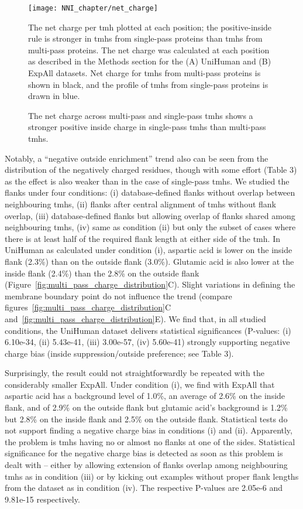 \begin{figure}[!ht]
\centering
\texttt{[image: NNI\_chapter/net\_charge]}
\caption{The net charge across multi-pass and single-pass \gls{tmh}s shows a stronger positive inside charge in single-pass \gls{tmh}s than multi-pass \gls{tmh}s.}
\medskip
\small
\justify
The net charge per \gls{tmh} plotted at each position; the positive-inside rule is stronger in \gls{tmh}s from single-pass proteins than \gls{tmh}s from multi-pass proteins. The net charge was calculated at each position as described in the Methods section for the (A) UniHuman and (B) ExpAll datasets. Net charge for \gls{tmh}s from multi-pass proteins is shown in black, and the profile of \gls{tmh}s from single-pass proteins is drawn in blue.
\label{fig:net_charge}
\end{figure}

Notably, a ``negative outside enrichment'' trend also can be seen from the distribution of the negatively charged residues, though with some effort (Table 3) as the effect is also weaker than in the case of single-pass \gls{tmh}s. We studied the flanks under four conditions: (i) database-defined flanks without overlap between neighbouring \gls{tmh}s, (ii) flanks after central alignment of \gls{tmh}s without flank overlap, (iii) database-defined flanks but allowing overlap of flanks shared among neighbouring \gls{tmh}s, (iv) same as condition (ii) but only the subset of cases where there is at least half of the required flank length at either side of the \gls{tmh}. In UniHuman as calculated under condition (i), aspartic acid is lower on the inside flank (2.3\%) than on the outside flank (3.0\%). Glutamic acid is also lower at the inside flank (2.4\%) than the 2.8\% on the outside flank (Figure~\ref{fig:multi_pass_charge_distribution}C). Slight variations in defining the membrane boundary point do not influence the trend (compare figures~\ref{fig:multi_pass_charge_distribution}C and~\ref{fig:multi_pass_charge_distribution}E). We find that, in all studied conditions, the UniHuman dataset delivers statistical significances (P-values: (i) 6.10e-34, (ii) 5.43e-41, (iii) 3.00e-57, (iv) 5.60e-41) strongly supporting negative charge bias (inside suppression/outside preference; see Table 3).

Surprisingly, the result could not straightforwardly be repeated with the considerably smaller ExpAll. Under condition (i), we find with ExpAll that aspartic acid has a background level of 1.0\%, an average of 2.6\% on the inside flank, and of 2.9\% on the outside flank but glutamic acid’s background is 1.2\% but 2.8\% on the inside flank and 2.5\% on the outside flank. Statistical tests do not support finding a negative charge bias in conditions (i) and (ii). Apparently, the problem is \gls{tmh}s having no or almost no flanks at one of the sides. Statistical significance for the negative charge bias is detected as soon as this problem is dealt with – either by allowing extension of flanks overlap among neighbouring \gls{tmh}s as in condition (iii) or by kicking out examples without proper flank lengths from the dataset as in condition (iv). The respective P-values are 2.05e-6 and 9.81e-15 respectively.


